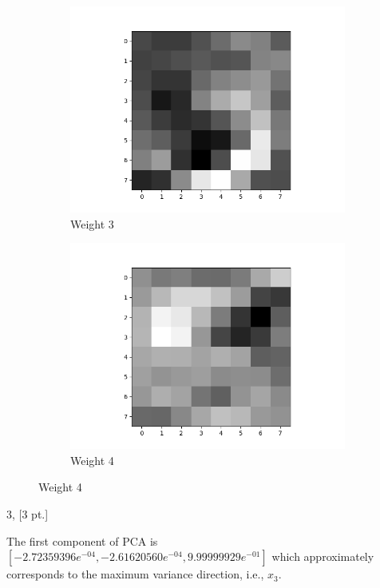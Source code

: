 \documentclass[12pt,letterpaper]{article}
\begin{document}
\begin{figure}
\begin{subfigure}[b]{0.24\textwidth}
        \includegraphics[width=\textwidth]{imgs/FA_weight_3.png}
        \caption{Weight 3}
        \label{FA_weight_3}
    \end{subfigure}
    \begin{subfigure}[b]{0.24\textwidth}
        \includegraphics[width=\textwidth]{imgs/FA_weight_4.png}
        \caption{Weight 4}
        \label{FA_weight_4}
    \end{subfigure}    
\end{figure}

3, [3 pt.]

The first component of PCA is $[-2.72359396e^{-04}, -2.61620560e^{-04}, 9.99999929e^{-01}]$ which approximately corresponds to the maximum variance direction, i.e., $x_3$.
\end{document}
